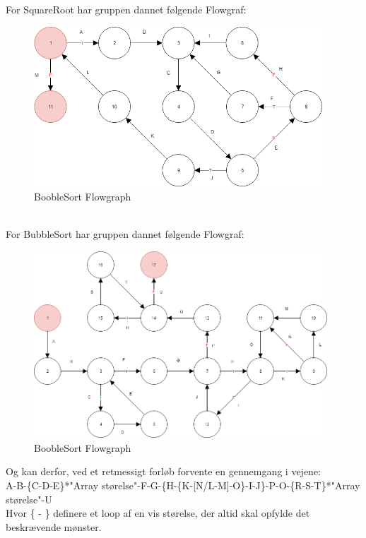 \documentclass[11pt]{article}
\begin{document}
    \noindent
    For SquareRoot har gruppen dannet følgende Flowgraf:\\
    \begin{subfigure}{1\textwidth}
        \centering
        \includegraphics[width=0.8\linewidth, height=6cm]{Struktureret_System_Udvikling/Workshop_3/SquareRoot_FlowGraph.png}
        \caption{BoobleSort Flowgraph}
        \label{fig:BoobleSortGraph}
    \end{subfigure}
    \\
    \noindent
    For BubbleSort har gruppen dannet følgende Flowgraf:\\
    \begin{subfigure}{1\textwidth}
        \centering
        \includegraphics[width=1\linewidth, height=7cm]{Struktureret_System_Udvikling/Workshop_3/Booble_Sort_Flowgraph.png}
        \caption{BoobleSort Flowgraph}
        \label{fig:BoobleSortGraph}
    \end{subfigure}
    Og kan derfor, ved et retmessigt forløb forvente en gennemgang i vejene:\\
    A-B-\{C-D-E\}*"Array størelse"-F-G-\{H-\{K-[N/L-M]-O\}-I-J\}-P-O-\{R-S-T\}*"Array størelse"-U\\
    Hvor \{ - \} definere et loop af en vis størelse, der altid skal opfylde det beskrævende mønster.\\
\end{document}
